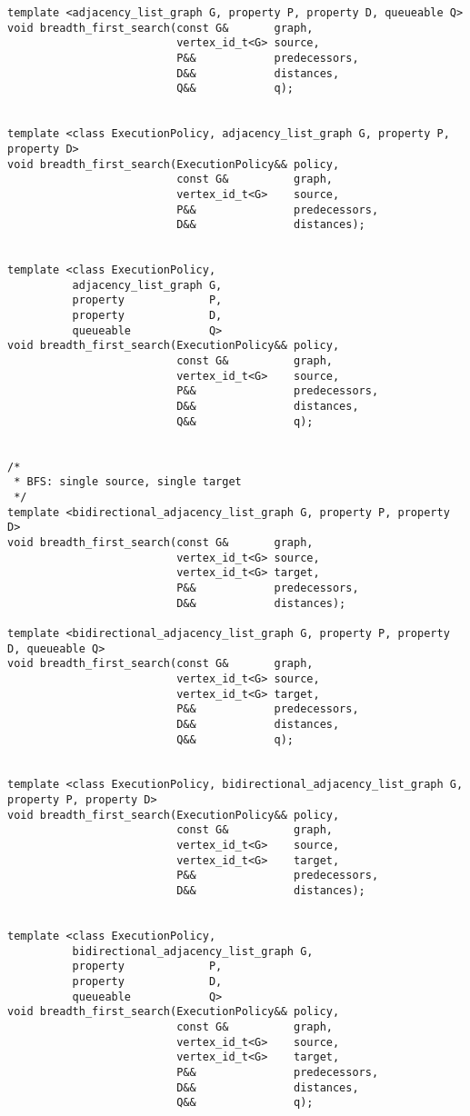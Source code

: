 \begin{lstlisting}
template <adjacency_list_graph G, property P, property D, queueable Q>
void breadth_first_search(const G&       graph,
                          vertex_id_t<G> source,
                          P&&            predecessors,
                          D&&            distances,
                          Q&&            q);


template <class ExecutionPolicy, adjacency_list_graph G, property P, property D>
void breadth_first_search(ExecutionPolicy&& policy,
                          const G&          graph,
                          vertex_id_t<G>    source,
                          P&&               predecessors,
                          D&&               distances);


template <class ExecutionPolicy,
          adjacency_list_graph G,
          property             P,
          property             D,
          queueable            Q>
void breadth_first_search(ExecutionPolicy&& policy,
                          const G&          graph,
                          vertex_id_t<G>    source,
                          P&&               predecessors,
                          D&&               distances,
                          Q&&               q);


/*
 * BFS: single source, single target
 */
template <bidirectional_adjacency_list_graph G, property P, property D>
void breadth_first_search(const G&       graph,
                          vertex_id_t<G> source,
                          vertex_id_t<G> target,
                          P&&            predecessors,
                          D&&            distances);

template <bidirectional_adjacency_list_graph G, property P, property D, queueable Q>
void breadth_first_search(const G&       graph,
                          vertex_id_t<G> source,
                          vertex_id_t<G> target,
                          P&&            predecessors,
                          D&&            distances,
                          Q&&            q);


template <class ExecutionPolicy, bidirectional_adjacency_list_graph G, property P, property D>
void breadth_first_search(ExecutionPolicy&& policy,
                          const G&          graph,
                          vertex_id_t<G>    source,
                          vertex_id_t<G>    target,
                          P&&               predecessors,
                          D&&               distances);


template <class ExecutionPolicy,
          bidirectional_adjacency_list_graph G,
          property             P,
          property             D,
          queueable            Q>
void breadth_first_search(ExecutionPolicy&& policy,
                          const G&          graph,
                          vertex_id_t<G>    source,
                          vertex_id_t<G>    target,
                          P&&               predecessors,
                          D&&               distances,
                          Q&&               q);


\end{lstlisting}
